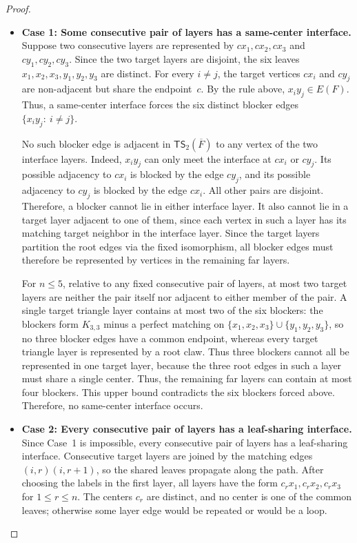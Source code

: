 \documentclass[a4paper]{article}
\theoremstyle{plain}
\theoremstyle{definition}
\newcommand{\TSsym}{\mathsf{TS}}
\numberwithin{equation}{section}
\begin{document}
\begin{proof}
\begin{itemize}
\item \textbf{Case 1: Some consecutive pair of layers has a same-center interface.}
Suppose two consecutive layers are represented by $cx_1,cx_2,cx_3$ and $cy_1,cy_2,cy_3$.
Since the two target layers are disjoint, the six leaves
$x_1,x_2,x_3,y_1,y_2,y_3$ are distinct.
For every $i\ne j$, the target vertices $cx_i$ and $cy_j$ are non-adjacent but share the endpoint~$c$.
By the rule above, $x_i y_j\in E(F)$.
Thus, a same-center interface forces the six distinct blocker edges $\{x_i y_j:\ i\ne j\}$.

No such blocker edge is adjacent in $\TSsym_2(\overline{F})$ to any vertex of the two interface layers.
Indeed, $x_i y_j$ can only meet the interface at $cx_i$ or $cy_j$.
Its possible adjacency to $cx_i$ is blocked by the edge $cy_j$, and its possible adjacency to $cy_j$ is blocked by the edge $cx_i$.
All other pairs are disjoint.
Therefore, a blocker cannot lie in either interface layer.
It also cannot lie in a target layer adjacent to one of them, since each vertex in such a layer has its matching target neighbor in the interface layer.
Since the target layers partition the root edges via the fixed isomorphism, all blocker edges must therefore be represented by vertices in the remaining far layers.

For $n\le 5$, relative to any fixed consecutive pair of layers, at most two target layers are neither the pair itself nor adjacent to either member of the pair.
A single target triangle layer contains at most two of the six blockers: the blockers form $K_{3,3}$ minus a perfect matching on
$\{x_1,x_2,x_3\}\cup\{y_1,y_2,y_3\}$,
so no three blocker edges have a common endpoint, whereas every target triangle layer is represented by a root claw.
Thus three blockers cannot all be represented in one target layer, because the three root edges in such a layer must share a single center.
Thus, the remaining far layers can contain at most four blockers.
This upper bound contradicts the six blockers forced above.
Therefore, no same-center interface occurs.

\item \textbf{Case 2: Every consecutive pair of layers has a leaf-sharing interface.}
Since Case~1 is impossible, every consecutive pair of layers has a leaf-sharing interface.
Consecutive target layers are joined by the matching edges $(i,r)(i,r+1)$, so the shared leaves propagate along the path.
After choosing the labels in the first layer, all layers have the form $c_r x_1,c_r x_2,c_r x_3$ for $1\le r\le n$.
The centers $c_r$ are distinct, and no center is one of the common leaves; otherwise some layer edge would be repeated or would be a loop.


\end{itemize}
\end{proof}
\end{document}
